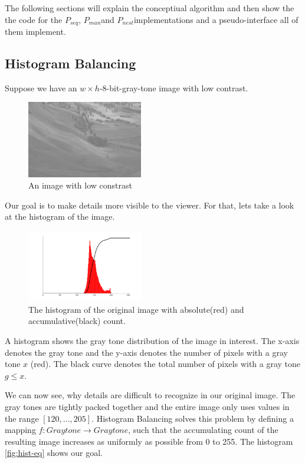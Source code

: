 \documentclass{article}
\newcommand{\seq}[0]{$P_{seq}$}
\newcommand{\man}[0]{$P_{man}$}
\newcommand{\ndpn}[0]{$P_{nest}$}
\newcommand{\range}[2]{$[#1,...,#2]$}
\begin{document}
    The following sections will explain the conceptiual algorithm
    and then show the the code for the \seq, \man and \ndpn implementations
    and a pseudo-interface all of them implement.
    
    \subsection{Histogram Balancing}
      Suppose we have an $w \times h$-8-bit-gray-tone image with low contrast.
      
      \begin{figure}[h]
        \centering
        \includegraphics[width=0.45\textwidth]{img-org}
        \caption{An image with low constrast}
        \label{fig:img-org}
      \end{figure}
      Our goal is to make details more visible to the viewer. For that,
      lets take a look at the histogram of the image.
      
      \begin{figure}[h]
        \centering
        \includegraphics[width=0.45\textwidth]{hist-org}
        \caption{The histogram of the original image with absolute(red) and accumulative(black) count.}
        \label{fig:hist-org}
      \end{figure}
      
      A histogram shows the gray tone distribution of the image in interest.
      The x-axis denotes the gray tone and the y-axis denotes the
      number of pixels with a gray tone $x$ (red). The black curve denotes the
      total number of pixels with a gray tone $g \leq x$.

      We can now see, why details are difficult to recognize in our original image.
      The gray tones are tightly packed together and the
      entire image only uses values in the range \range{120}{205}.
      Histogram Balancing solves this problem by defining a mapping
      $f: Graytone \rightarrow Graytone$, such that the accumulating count
      of the resulting image increases as uniformly as possible from 0 to 255.
      The histogram \ref{fig:hist-eq} shows our goal.
      
\end{document}
